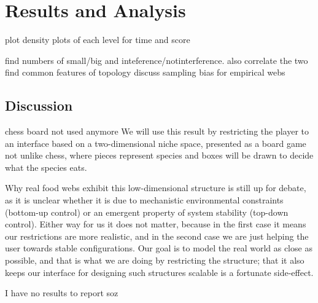\section{Results and Analysis}

plot density plots of each level for time and score

find numbers of small/big and inteference/notinterference. also correlate the two
find common features of topology
discuss sampling bias for empirical webs

\subsection{Discussion}
     chess board not used anymore
        We will use this result by restricting the player to an interface based on a two-dimensional niche space, presented as a board game not unlike chess, where pieces represent species and boxes will be drawn to decide what the species eats.

        Why real food webs exhibit this low-dimensional structure is still up for debate, as it is unclear whether it is due to mechanistic environmental constraints (bottom-up control) or an emergent property of system stability (top-down control).
        Either way for us it does not matter, because in the first case it means our restrictions are more realistic, and in the second case we are just helping the user towards stable configurations.
        Our goal is to model the real world as close as possible, and that is what we are doing by restricting the structure; that it also keeps our interface for designing such structures scalable is a fortunate side-effect.

I have no results to report soz